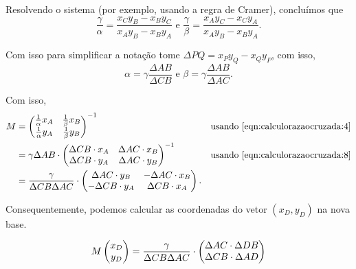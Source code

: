 \begin{sol}

Resolvendo o sistema (por exemplo, usando a regra de Cramer), concluímos que
\begin{equation}
  \frac{\gamma}{\alpha} = \frac{x_Cy_B-x_By_C}{x_Ay_B-x_By_A} \text{ e } \frac{\gamma}{\beta} = \frac{x_Ay_C-x_Cy_A}{x_Ay_B-x_By_A}.
\end{equation}

Com isso para simplificar a notação tome $\Delta PQ = x_Py_Q-x_Qy_P$, com isso,
\begin{equation} \label{eqn:calculorazaocruzada:8}
  \alpha = \gamma\frac{\Delta AB}{\Delta CB} \text{ e } \beta = \gamma\frac{\Delta AB}{\Delta AC}.
\end{equation}

Com isso,
\begin{align}
  M &= \begin{pmatrix} \frac{1}{\alpha} x_A& \frac{1}{\beta} x_B\\ \frac{1}{\alpha} y_A& \frac{1}{\beta} y_B \end{pmatrix}^{-1} & \text{usando \ref{eqn:calculorazaocruzada:4}} \\
    &= \gamma\Delta AB \cdot \begin{pmatrix}
    \Delta CB \cdot x_A& \Delta AC \cdot x_B \\
    \Delta CB \cdot y_A& \Delta AC \cdot y_B
  \end{pmatrix}^{-1} & \text{usando \ref{eqn:calculorazaocruzada:8}} \\
    &= \frac{\gamma}{\Delta CB \Delta AC} \cdot \begin{pmatrix}
    \Delta AC \cdot y_B & -\Delta AC \cdot x_B \\
    -\Delta CB \cdot y_A& \Delta CB \cdot x_A
  \end{pmatrix}.
\end{align}

Consequentemente, podemos calcular as coordenadas do vetor \((x_D, y_D)\) na nova base.

\begin{equation}
	 M \begin{pmatrix} x_D \\ y_D \\  \end{pmatrix} =  \frac{\gamma}{\Delta CB \Delta AC} \cdot \begin{pmatrix} \Delta AC \cdot \Delta DB \\ \Delta CB \cdot \Delta AD \\  \end{pmatrix}
\end{equation}



\end{sol}
